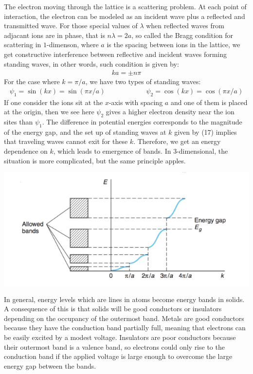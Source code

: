 \documentclass[11pt]{article}
\theoremstyle{break}
\theoremstyle{break}
\begin{document}
The electron moving through the lattice is a scattering problem. At each point of interaction, the electron can be modeled as an incident wave plus a reflected and transmitted wave. For those special values of $\lambda$ when reflected waves from adjacant ions are in phase, that is $n\lambda = 2a$, so called the Bragg condition for scattering in $1$-dimenson,  where $a$ is the spacing between ions in the lattice, we get constructive interference between reflective and incident waves forming standing waves, in other words, such condition is given by:
\begin{align}
ka = \pm n \pi
\end{align}
For the case where $k = \pi /a$, we have two types of standing waves:
\begin{align*}
\psi_1 = \sin(kx) = \sin(\pi x/a) \qquad\qquad\qquad \psi_2 =\cos(kx) = \cos(\pi x/a)
\end{align*}
If one consider the ions sit at the $x$-axis with spacing $a$ and one of them is placed at the origin, then we see here $\psi_2$ gives a higher electron density near the ion sites than $\psi_1$. The difference in potential energies corresponds to the magnitude of the energy gap, and the set up of standing waves at $k$ given by (17) implies that traveling waves cannot exit for these $k$. Therefore, we get an energy dependence on $k$, which leads to emergence of bands. In $3$-dimensional, the situation is more complicated, but the same principle apples. 
\begin{center}
\includegraphics[scale=0.9]{allowedBands}
\end{center}

In general, energy levels which are lines in atoms become energy bands in solids. A consequence of this is that solids will be good conductors or insulators depending on the occupancy of the outermost band. Metals are good conductors because they have the conduction band partially full, meaning that electrons can be easily excited by a modest voltage. Insulators are poor conductors because their outermost band is a valence band, so electrons could only rise to the conduction band if the applied voltage is large enough to overcome the large energy gap between the bands. \\
\end{document}
